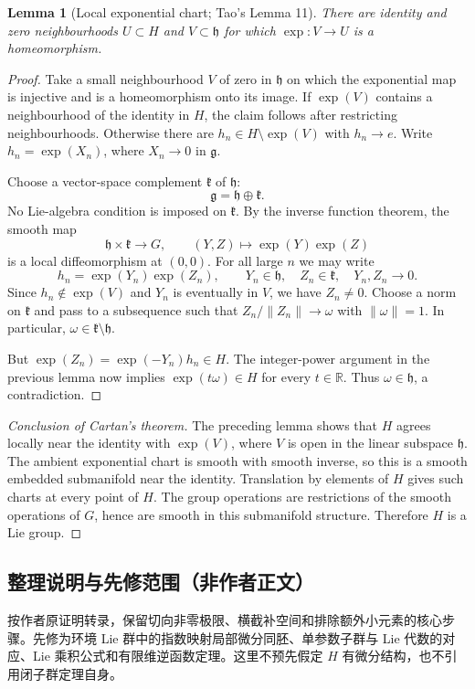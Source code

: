 \documentclass[UTF8,11pt]{ctexart}
\newtheorem*{lemma}{Lemma}
\theoremstyle{definition}
\newcommand{\R}{\mathbb R}
\begin{document}
\begin{lemma}[Local exponential chart; Tao's Lemma 11]
There are identity and zero neighbourhoods $U\subset H$ and
$V\subset\mathfrak h$ for which $\exp:V\to U$ is a homeomorphism.
\end{lemma}
\begin{proof}
Take a small neighbourhood $V$ of zero in $\mathfrak h$ on which the
exponential map is injective and is a homeomorphism onto its image.
If $\exp(V)$ contains a neighbourhood of the identity in $H$, the claim
follows after restricting neighbourhoods. Otherwise there are
$h_n\in H\setminus\exp(V)$ with $h_n\to e$. Write
$h_n=\exp(X_n)$, where $X_n\to0$ in $\mathfrak g$.

Choose a vector-space complement $\mathfrak k$ of $\mathfrak h$:
\[
 \mathfrak g=\mathfrak h\oplus\mathfrak k.
\]
No Lie-algebra condition is imposed on $\mathfrak k$. By the inverse
function theorem, the smooth map
\[
 \mathfrak h\times\mathfrak k\longrightarrow G,
 \qquad(Y,Z)\longmapsto\exp(Y)\exp(Z)
\]
is a local diffeomorphism at $(0,0)$. For all large $n$ we may write
\[
 h_n=\exp(Y_n)\exp(Z_n),\qquad
 Y_n\in\mathfrak h,\quad Z_n\in\mathfrak k,\quad Y_n,Z_n\to0.
\]
Since $h_n\notin\exp(V)$ and $Y_n$ is eventually in $V$, we have $Z_n\ne0$.
Choose a norm on $\mathfrak k$ and pass to a subsequence such that
$Z_n/\|Z_n\|\to\omega$ with $\|\omega\|=1$. In particular,
$\omega\in\mathfrak k\setminus\mathfrak h$.

But $\exp(Z_n)=\exp(-Y_n)h_n\in H$. The integer-power argument in the
previous lemma now implies $\exp(t\omega)\in H$ for every $t\in\R$.
Thus $\omega\in\mathfrak h$, a contradiction.
\end{proof}

\begin{proof}[Conclusion of Cartan's theorem]
The preceding lemma shows that $H$ agrees locally near the identity with
$\exp(V)$, where $V$ is open in the linear subspace $\mathfrak h$.
The ambient exponential chart is smooth with smooth inverse, so this is
a smooth embedded submanifold near the identity. Translation by elements
of $H$ gives such charts at every point of $H$. The group operations are
restrictions of the smooth operations of $G$, hence are smooth in this
submanifold structure. Therefore $H$ is a Lie group.
\end{proof}

\subsection*{整理说明与先修范围（非作者正文）}
按作者原证明转录，保留切向非零极限、横截补空间和排除额外小元素的核心步骤。先修为环境 Lie 群中的指数映射局部微分同胚、单参数子群与 Lie 代数的对应、Lie 乘积公式和有限维逆函数定理。这里不预先假定 $H$ 有微分结构，也不引用闭子群定理自身。
\end{document}
